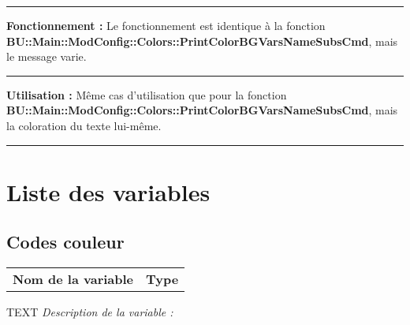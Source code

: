 \documentclass[a4paper,10pt]{article}
\begin{document}

\par\noindent\rule{\textwidth}{0.4pt}

\begin{justify}
    \textbf{Fonctionnement :} Le fonctionnement est identique à la fonction \textbf{\color{func}BU::Main::ModConfig::Colors::PrintColorBGVarsNameSubsCmd}, mais le message varie.
\end{justify}


\par\noindent\rule{\textwidth}{0.4pt}

\begin{justify}
    \textbf{Utilisation :} Même cas d'utilisation que pour la fonction \textbf{\color{func}BU::Main::ModConfig::Colors::PrintColorBGVarsNameSubsCmd}, mais la coloration du texte lui-même.
\end{justify}








\color{sec1}\par\noindent\rule{\textwidth}{0.4pt}\color{text}

\color{sec1}
\section{Liste des variables}\color{text}

\color{sec2}
\subsection{Codes couleur}\color{text}

\begin{justify}
    \begin{tabular}{l|l}
        \textbf{Nom de la variable} & \textbf{Type}
    \end{tabular}
\end{justify}

\begin{justify}TEXT
    \textit{Description de la variable :}
\end{justify}

\end{document}
